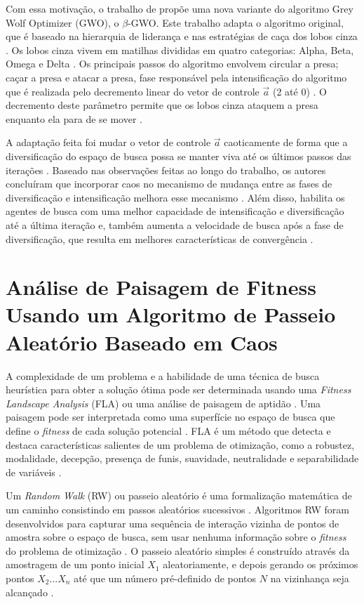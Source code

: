 Com essa motivação, o trabalho de \cite{saxena} propõe uma nova variante do algoritmo Grey Wolf Optimizer (GWO), o $\beta$-GWO. Este trabalho adapta o algoritmo original, que é baseado na hierarquia de liderança e nas estratégias de caça dos lobos cinza \cite{saxena}. Os lobos cinza vivem em matilhas divididas em quatro categorias: Alpha, Beta, Omega e Delta \cite{saxena}. Os principais passos do algoritmo envolvem circular a presa; caçar a presa e atacar a presa, fase responsável pela intensificação do algoritmo que é realizada pelo decremento linear do vetor de controle $\Vec{a}$ (2 até 0) \cite{saxena}. O decremento deste parâmetro permite que os lobos cinza ataquem a presa enquanto ela para de se mover \cite{saxena}.

A adaptação feita foi mudar o vetor de controle $\Vec{a}$ caoticamente de forma que a diversificação do espaço de busca possa se manter viva até os últimos passos das iterações \cite{saxena}. Baseado nas observações feitas ao longo do trabalho, os autores concluíram que incorporar caos no mecanismo de mudança entre as fases de diversificação e intensificação melhora esse mecanismo \cite{saxena}. Além disso, habilita os agentes de busca com uma melhor capacidade de intensificação e diversificação até a última iteração e, também aumenta a velocidade de busca após a fase de diversificação, que resulta em melhores características de convergência \cite{saxena}.

\section{Análise de Paisagem de Fitness Usando um Algoritmo de Passeio Aleatório Baseado em Caos}

A complexidade de um problema e a habilidade de uma técnica de busca heurística para obter a solução ótima pode ser determinada usando uma \textit{Fitness Landscape Analysis} (FLA) ou uma análise de paisagem de aptidão \cite{jana}. Uma paisagem pode ser interpretada como uma superfície no espaço de busca que define o \textit{fitness} de cada solução potencial \cite{jana}. FLA é um método que detecta e destaca características salientes de um problema de otimização, como a robustez, modalidade, decepção, presença de funis, suavidade, neutralidade e separabilidade de variáveis \cite{jana}.

Um \textit{Random Walk} (RW) ou passeio aleatório é uma formalização matemática de um caminho consistindo em passos aleatórios sucessivos \cite{jana}. Algoritmos RW foram desenvolvidos para capturar uma sequência de interação vizinha de pontos de amostra sobre o espaço de busca, sem usar nenhuma informação sobre o \textit{fitness} do problema de otimização \cite{jana}. O passeio aleatório simples é construído através da amostragem de um ponto inicial $X_1$ aleatoriamente, e depois gerando os próximos pontos $X_2 ... X_n$ até que um número pré-definido de pontos $N$ na vizinhança seja alcançado \cite{jana}.

